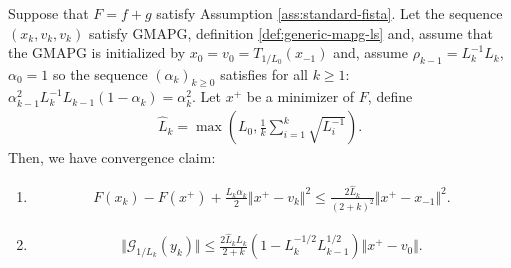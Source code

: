 \documentclass[12pt]{report}
\begin{document}
        \begin{theorem}\label{thm:gmapg-specialized-convergence}
            Suppose that $F = f + g$ satisfy Assumption \ref{ass:standard-fista}. 
            Let the sequence $(x_k, v_k, v_k)$ satisfy GMAPG, definition \ref{def:generic-mapg-ls} and, assume that the GMAPG is initialized by $x_0 = v_0 = T_{1/L_0}(x_{-1})$ and, assume $\rho_{k - 1} = L_{k}^{-1}L_{k}$, $\alpha_0 = 1$ so the sequence $(\alpha_k)_{k \ge 0}$ satisfies for all $k\ge 1$: $\alpha_{k - 1}^2L_k^{-1}L_{k - 1}(1 - \alpha_k) = \alpha_k^2$. 
            Let $x^+$ be a minimizer of $F$, define 
            \begin{align*}
                \hat L_k = \max\left(
                    L_0, \frac{1}{k}\sum_{i = 1}^{k} \sqrt{L_i^{-1}}
                \right). 
            \end{align*}
            Then, we have convergence claim: 
            \begin{enumerate}
                \item \begin{align*}
                    F(x_k) - F(x^+) + \frac{L_k\alpha_k}{2}\Vert x^+ - v_k\Vert^2 \le 
                    \frac{2\hat L_k}{(2 + k)^2}\Vert x^+ - x_{-1}\Vert^2.
                \end{align*}
                \item 
                \begin{align*}
                    \Vert \mathcal G_{1/L_k}(y_k)\Vert \le 
                    \frac{2\hat L_k L_k}{2 + k}
                    \left(
                        1 - L_k^{-1/2}L_{k - 1}^{1/2}
                    \right)
                    \Vert x^+ - v_0\Vert. 
                \end{align*}
            \end{enumerate}
        \end{theorem}
\end{document}
